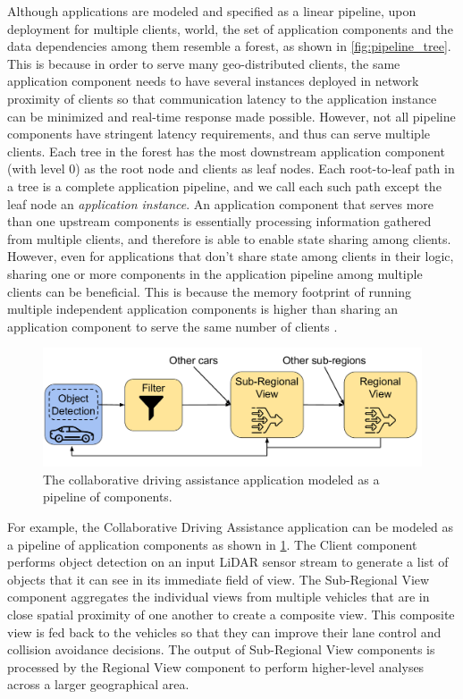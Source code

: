 Although applications are modeled and specified as a linear pipeline, upon deployment for multiple clients, world, the set of application components and the data dependencies among them resemble a forest, as shown in \cref{fig:pipeline_tree}. This is because in order to serve many geo-distributed clients, the same application component needs to have several instances deployed in network proximity of clients so that communication latency to the application instance can be minimized and real-time response made possible. However, not all pipeline components have stringent latency requirements, and thus can serve multiple clients. Each tree in the forest has the most downstream application component (with level 0) as the root node and clients as leaf nodes. Each root-to-leaf path in a tree is a complete application pipeline, and we call each such path except the leaf node an \textit{application instance}. An application component that serves more than one upstream components is essentially processing information gathered from multiple clients, and therefore is able to enable state sharing among clients. However, even for applications that don't share state among clients in their logic, sharing one or more components in the application pipeline among multiple clients can be beneficial. This is because the memory footprint of running multiple independent application components is higher than sharing an application component to serve the same number of clients .

\begin{figure}[ht]
\centering
\includegraphics[width=0.8\columnwidth]{figures/oneedge/collaborative_driving_app.pdf}
\caption{The collaborative driving assistance application modeled as a pipeline of components.}
\label{fig:collab_driving_pipeline}
\end{figure}

\par For example, the Collaborative Driving Assistance application can be modeled as a pipeline of application components as shown in \cref{fig:collab_driving_pipeline}. The Client component performs object detection on an input LiDAR sensor stream to generate a list of objects that it can see in its immediate field of view. The Sub-Regional View component aggregates the individual views from multiple vehicles that are in close spatial proximity of one another to create a composite view. This composite view is fed back to the vehicles so that they can improve their lane control and collision avoidance decisions. The output of Sub-Regional View components is processed by the Regional View component to perform higher-level analyses across a larger geographical area.


